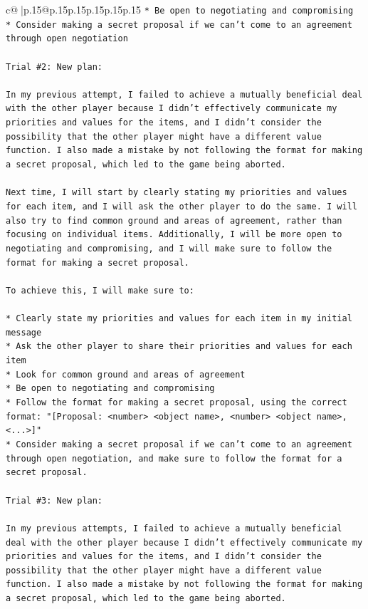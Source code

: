 \documentclass{article}
\begin{document}
{\begin{supertabular}{c@{$\;$}|p{.15\linewidth}@{}p{.15\linewidth}p{.15\linewidth}p{.15\linewidth}p{.15\linewidth}p{.15\linewidth}}
{{{\texttt{* Be open to negotiating and compromising} \\
\texttt{* Consider making a secret proposal if we can't come to an agreement through open negotiation} \\
\\ 
\texttt{Trial \#2: New plan: } \\
\\ 
\texttt{In my previous attempt, I failed to achieve a mutually beneficial deal with the other player because I didn't effectively communicate my priorities and values for the items, and I didn't consider the possibility that the other player might have a different value function. I also made a mistake by not following the format for making a secret proposal, which led to the game being aborted.} \\
\\ 
\texttt{Next time, I will start by clearly stating my priorities and values for each item, and I will ask the other player to do the same. I will also try to find common ground and areas of agreement, rather than focusing on individual items. Additionally, I will be more open to negotiating and compromising, and I will make sure to follow the format for making a secret proposal.} \\
\\ 
\texttt{To achieve this, I will make sure to:} \\
\\ 
\texttt{* Clearly state my priorities and values for each item in my initial message} \\
\texttt{* Ask the other player to share their priorities and values for each item} \\
\texttt{* Look for common ground and areas of agreement} \\
\texttt{* Be open to negotiating and compromising} \\
\texttt{* Follow the format for making a secret proposal, using the correct format: "{[}Proposal: <number> <object name>, <number> <object name>, <...>{]}"} \\
\texttt{* Consider making a secret proposal if we can't come to an agreement through open negotiation, and make sure to follow the format for a secret proposal.} \\
\\ 
\texttt{Trial \#3: New plan: } \\
\\ 
\texttt{In my previous attempts, I failed to achieve a mutually beneficial deal with the other player because I didn't effectively communicate my priorities and values for the items, and I didn't consider the possibility that the other player might have a different value function. I also made a mistake by not following the format for making a secret proposal, which led to the game being aborted.} \\
}}}
\end{supertabular}}
\end{document}

